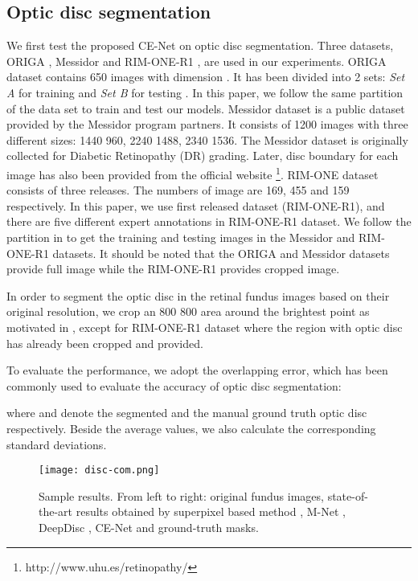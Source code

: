 \documentclass[journal]{IEEEtran}
\begin{document}
\subsection{Optic disc segmentation}
We first test the proposed CE-Net on optic disc segmentation. Three datasets, 
  ORIGA \cite{zhang2010origa}, Messidor \cite{decenciere2014feedback} and RIM-ONE-R1 \cite{fumero2011rim}, are used in our experiments. ORIGA dataset contains  650 images with dimension . It has  been divided into 2 sets: \emph{Set A} for training and \emph{Set B} for testing \cite{cheng2018sparse}. In this paper, we follow the same partition of the data set to train and test our models. Messidor dataset is a public dataset provided by the Messidor program partners. It consists of 1200 images with three different sizes: 1440  960, 2240  1488, 2340  1536. The Messidor dataset is originally collected for Diabetic Retinopathy (DR) grading. Later, disc boundary for each image has also been provided from the official website \footnote{http://www.uhu.es/retinopathy/}. RIM-ONE dataset consists of three releases. The numbers of image are 169, 455 and 159 respectively. In this paper, we use first released dataset (RIM-ONE-R1), and  there are five different expert annotations in RIM-ONE-R1 dataset. We follow the partition in \cite{li2018learning} to get the training and testing images in the Messidor and RIM-ONE-R1 datasets. It should be noted that the ORIGA and Messidor datasets provide full image while the RIM-ONE-R1 provides cropped image.



In order to segment the optic disc in the retinal fundus images based on their original resolution, we crop an 800  800 area around the brightest point as motivated in \cite{zhang2010optic}, except for RIM-ONE-R1 dataset where the region with optic disc has already been cropped and provided. 


To evaluate the performance, we adopt the overlapping error, which has been commonly used to evaluate the accuracy of optic disc segmentation:

where  and  denote the segmented and the manual ground truth optic disc respectively. Beside the average values, we also calculate the corresponding standard deviations.


\begin{figure*}[ht]
	\centering
	\texttt{[image: disc-com.png]}\vspace{-.12cm}
	\caption{Sample results. From left to right: original fundus images, state-of-the-art results obtained by superpixel based method \cite{cheng2013superpixel}, M-Net \cite{fu2018joint}, DeepDisc \cite{gu2018deepdisc}, CE-Net and ground-truth masks.}
	\label{6}\vspace{-.25cm}
\end{figure*}
\end{document}
